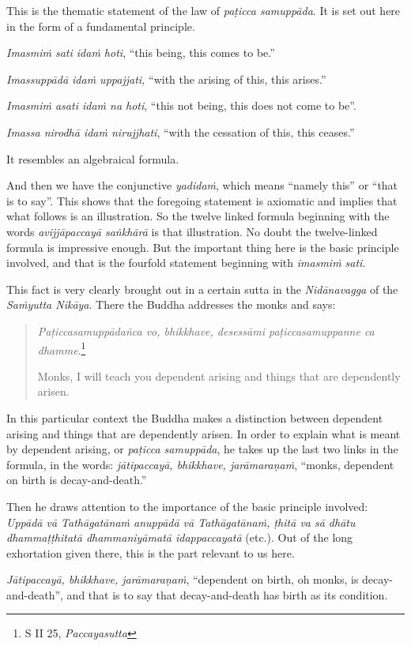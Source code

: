 This is the thematic statement of the law of \emph{paṭicca samuppāda}. It is set out here in the form of a fundamental principle.

\emph{Imasmiṁ sati idaṁ hoti}, ``this being, this comes to be.''

\emph{Imassuppādā idaṁ uppajjati,} ``with the arising of this, this arises.''

\emph{Imasmiṁ asati idaṁ na hoti}, ``this not being, this does not come to be''.

\emph{Imassa nirodhā idaṁ nirujjhati}, ``with the cessation of this, this ceases.''

It resembles an algebraical formula.

And then we have the conjunctive \emph{yadidaṁ}, which means ``namely this'' or ``that is to say''. This shows that the foregoing statement is axiomatic and implies that what follows is an illustration. So the twelve linked formula beginning with the words \emph{avijjāpaccayā saṅkhārā} is that illustration. No doubt the twelve-linked formula is impressive enough. But the important thing here is the basic principle involved, and that is the fourfold statement beginning with \emph{imasmiṁ sati}.

This fact is very clearly brought out in a certain sutta in the \emph{Nidānavagga} of the \emph{Saṁyutta Nikāya}. There the Buddha addresses the monks and says:

\begin{quote}
\emph{Paṭiccasamuppādañca vo, bhikkhave, desessāmi paṭiccasamuppanne ca dhamme}.\footnote{S II 25, \emph{Paccayasutta}}

Monks, I will teach you dependent arising and things that are dependently arisen.
\end{quote}

In this particular context the Buddha makes a distinction between dependent arising and things that are dependently arisen. In order to explain what is meant by dependent arising, or \emph{paṭicca samuppāda}, he takes up the last two links in the formula, in the words: \emph{jātipaccayā, bhikkhave, jarāmaraṇaṁ}, ``monks, dependent on birth is decay-and-death.''

Then he draws attention to the importance of the basic principle involved: \emph{Uppādā vā Tathāgatānaṁ anuppādā vā Tathāgatānaṁ, ṭhitā va sā dhātu dhammaṭṭhitatā dhammaniyāmatā idappaccayatā} (etc.). Out of the long exhortation given there, this is the part relevant to us here.

\emph{Jātipaccayā, bhikkhave, jarāmaraṇaṁ}, ``dependent on birth, oh monks, is decay-and-death'', and that is to say that decay-and-death has birth as its condition.

